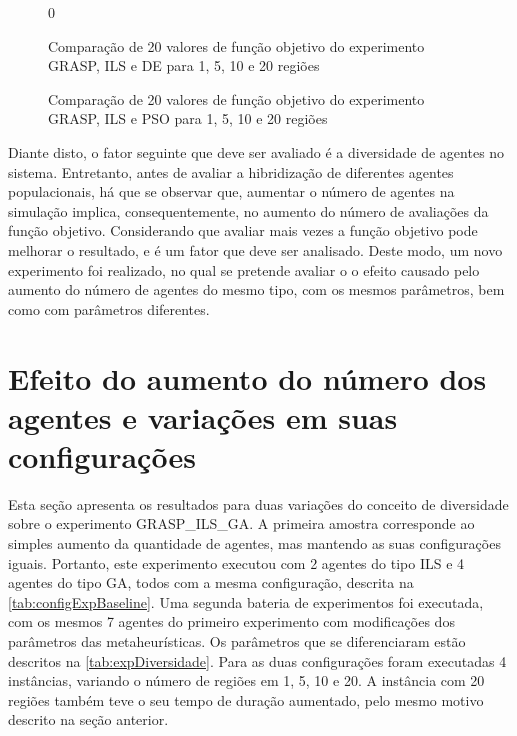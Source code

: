 \begin{figure}
    \centering
    \caption{Comparação de 20 valores de função objetivo do experimento GRASP, ILS e DE para 1, 5, 10 e 20 regiões}0
    
    \label{fig:A1boxplot}
\end{figure}

\begin{figure}
    \centering
    \caption{Comparação de 20 valores de função objetivo do experimento GRASP, ILS e PSO para 1, 5, 10 e 20 regiões}
    
    \label{fig:A2boxplot}
\end{figure}

Diante disto, o fator seguinte que deve ser avaliado é a diversidade de agentes no sistema. Entretanto, antes de avaliar a hibridização de diferentes agentes populacionais, há que se observar que, aumentar o número de agentes na simulação implica, consequentemente, no aumento do número de avaliações da função objetivo. Considerando que avaliar mais vezes a função objetivo pode melhorar o resultado, e é um fator que deve ser analisado. Deste modo, um novo  experimento foi realizado, no qual se pretende avaliar o o efeito causado pelo aumento do número de agentes do mesmo tipo, com os mesmos parâmetros, bem como com parâmetros diferentes. 

\section{Efeito do aumento do número dos agentes e variações em suas configurações}
\label{sec:aumentandoAgentes}

Esta seção apresenta os resultados para duas variações do conceito de diversidade sobre o experimento GRASP\_ILS\_GA. A primeira amostra corresponde ao simples aumento da quantidade de agentes, mas mantendo as suas configurações iguais. Portanto, este experimento executou com 2 agentes do tipo ILS e 4 agentes do tipo GA, todos com a mesma configuração, descrita na \autoref{tab:configExpBaseline}. Uma segunda bateria de experimentos foi executada, com os mesmos 7 agentes do primeiro experimento com modificações dos parâmetros das metaheurísticas. Os parâmetros que se diferenciaram estão descritos na \autoref{tab:expDiversidade}. Para as duas configurações foram executadas 4 instâncias, variando o número de regiões em 1, 5, 10 e 20. A instância com 20 regiões também teve o seu tempo de duração aumentado, pelo mesmo motivo descrito na seção anterior. 

